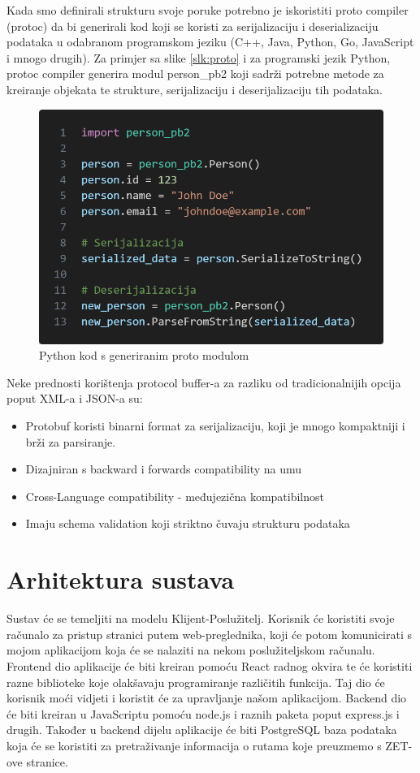 \documentclass[zavrsnirad]{fer}
\begin{document}
Kada smo definirali strukturu svoje poruke potrebno je iskoristiti proto compiler (protoc) da bi generirali kod koji se koristi za serijalizaciju i deserializaciju podataka u odabranom programskom jeziku (C++, Java, Python, Go, JavaScript i mnogo drugih). Za primjer sa slike \ref{slk:proto} i za programski jezik Python, protoc compiler generira modul person\_pb2 koji sadrži potrebne metode za kreiranje objekata te strukture, serijalizaciju i deserijalizaciju tih podataka. 

\begin{figure}[htb]
	\centering
	\includegraphics[width=0.6\linewidth]{Figures/protoc.png} 
	\caption{Python kod s generiranim proto modulom}
	\label{slk:routes}
\end{figure}

Neke prednosti korištenja protocol buffer-a za razliku od tradicionalnijih opcija poput XML-a i JSON-a su:

\begin{itemize}
	\item Protobuf koristi binarni format za serijalizaciju, koji je mnogo kompaktniji i brži za parsiranje.
	\item Dizajniran s backward i forwards compatibility na umu 
	\item Cross-Language compatibility - međujezična kompatibilnost
	\item Imaju schema validation koji striktno čuvaju strukturu podataka
\end{itemize}

\newpage
\section{Arhitektura sustava}

Sustav će se temeljiti na modelu Klijent-Poslužitelj. Korisnik će koristiti svoje računalo za pristup
stranici putem web-preglednika, koji će potom komunicirati s mojom aplikacijom koja će se nalaziti
na nekom poslužiteljskom računalu. Frontend dio aplikacije će biti kreiran pomoću React radnog
okvira te će koristiti razne biblioteke koje olakšavaju programiranje različitih funkcija. Taj dio će
korisnik moći vidjeti i koristit će za upravljanje našom aplikacijom. Backend dio će biti kreiran u
JavaScriptu pomoću node.js i raznih paketa poput express.js i drugih. Također u backend dijelu
aplikacije će biti PostgreSQL baza podataka koja će se koristiti za pretraživanje informacija o
rutama koje preuzmemo s ZET-ove stranice.
\end{document}
